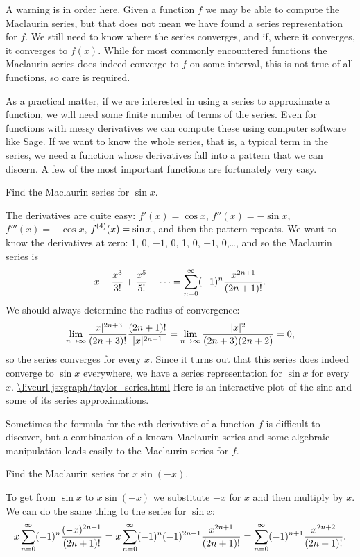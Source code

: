 A warning is in order here. Given a function $f$ we may be able to
compute the Maclaurin series, but that does not mean we have found a
series representation for $f$. We still need to know where the series
converges, and if, where it converges, it converges to $f(x)$. While
for most commonly encountered functions the Maclaurin series does
indeed converge to $f$ on some interval, this is not true of all
functions, so care is required.

As a practical matter, if we are interested in using a series to
approximate a function, we will need some finite number of terms of
the series. Even for functions with messy derivatives we can compute
these using computer software like Sage. If we want to
know the whole series, that is, a typical term in the series, we need
a function whose derivatives fall into a pattern that we can
discern. A few of the most important functions are fortunately very
easy.

\example Find the Maclaurin series for $\sin x$.

The derivatives are quite easy: $f'(x)=\cos x$, $f''(x)=-\sin x$,
$f'''(x)=-\cos x$, $\displaystyle f^{(4)}(x)=\sin x$, and then the pattern
repeats. We want to know the derivatives at zero:
1, 0, $-1$, 0, 1, 0, $-1$, 0,\dots, and so the Maclaurin series is
$$
  x-{x^3\over 3!}+{x^5\over 5!}-\cdots=
  \sum_{n=0}^\infty (-1)^n{x^{2n+1}\over (2n+1)!}.
$$
We should always determine the radius of convergence:
$$
  \lim_{n\to\infty} {|x|^{2n+3}\over (2n+3)!}{(2n+1)!\over |x|^{2n+1}}
  =\lim_{n\to\infty} {|x|^2\over (2n+3)(2n+2)}=0,
$$
so the series converges for every $x$. Since it turns out that this
series does indeed converge to $\sin x$ everywhere, we have a series
representation for $\sin x$ for every $x$.
\texonly 
\expandafter\url\expandafter{\liveurl jsxgraph/taylor_series.html}%
Here is an interactive plot\endurl\ of the sine and some of its 
series approximations.
\endtexonly
\endexample

Sometimes the formula for the $n$th derivative of a function $f$ is
difficult to discover, but a combination of a known Maclaurin series
and some algebraic manipulation leads easily to the Maclaurin series
for $f$.

\example Find the Maclaurin series for $x\sin(-x)$.

To get from $\sin x$ to $x\sin(-x)$ we substitute $-x$ for $x$ and
then multiply by $x$. We can do the same thing to the series for $\sin
x$:
$$
  x\sum_{n=0}^\infty (-1)^n{(-x)^{2n+1}\over (2n+1)!}
  =x\sum_{n=0}^\infty (-1)^{n}(-1)^{2n+1}{x^{2n+1}\over (2n+1)!}
  =\sum_{n=0}^\infty (-1)^{n+1}{x^{2n+2}\over (2n+1)!}.
$$
\endexample

